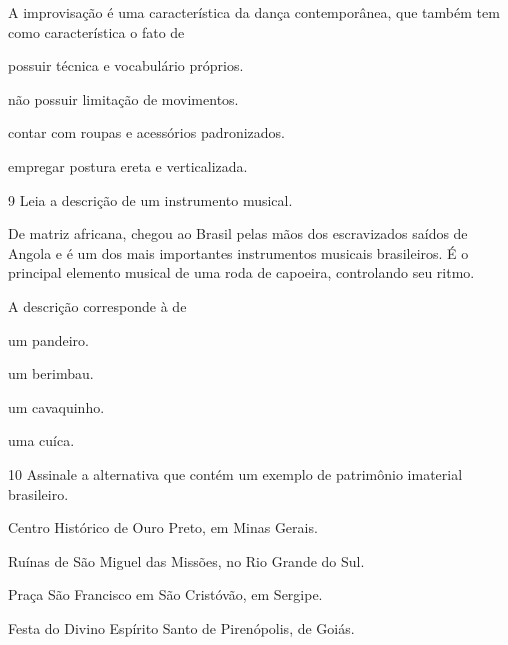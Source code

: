 A improvisação é uma característica da dança contemporânea, que também tem como característica o fato de

\begin{minipage}{.5\textwidth}
\begin{escolha}
\item
  possuir técnica e vocabulário próprios.
\item
  não possuir limitação de movimentos.
\item
  contar com roupas e acessórios padronizados.
\item
  empregar postura ereta e verticalizada.
\end{escolha}
\end{minipage}

\num{9}  Leia a descrição de um instrumento musical.

De matriz africana, chegou ao Brasil pelas mãos dos escravizados saídos de Angola
e é um dos mais importantes instrumentos musicais brasileiros. É o principal
elemento musical de uma roda de capoeira, controlando seu ritmo.

A descrição corresponde à de

\begin{minipage}{.5\textwidth}
\begin{escolha}
\item
  um pandeiro.
\item
  um berimbau.
\item
  um cavaquinho.
\item
  uma cuíca.
\end{escolha}
\end{minipage}

\num{10} Assinale a alternativa que contém um exemplo de patrimônio imaterial brasileiro.

\begin{escolha}
\item
  Centro Histórico de Ouro Preto, em Minas Gerais.
\item
  Ruínas de São Miguel das Missões, no Rio Grande do Sul.
\item
  Praça São Francisco em São Cristóvão, em Sergipe.
\item
  Festa do Divino Espírito Santo de Pirenópolis, de Goiás.
\end{escolha}

